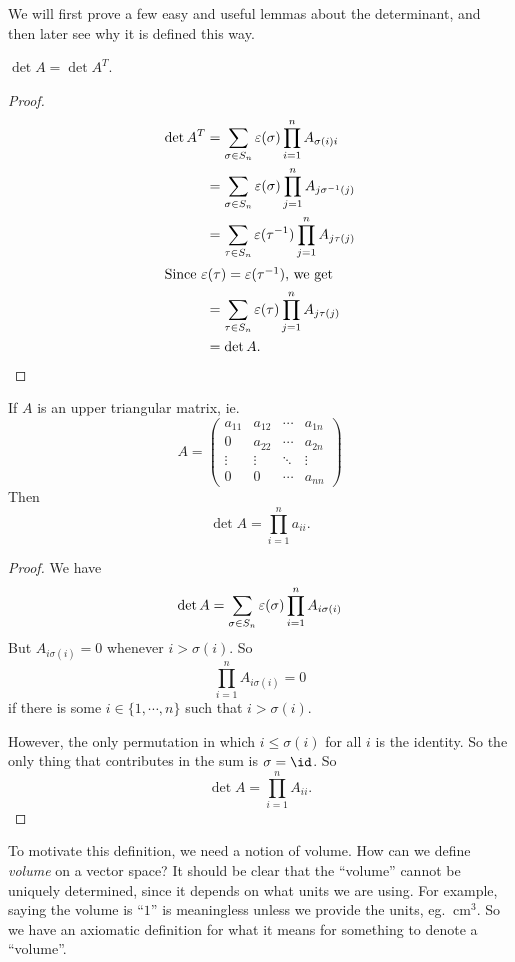 \documentclass[a4paper]{article}
\begin{document}
We will first prove a few easy and useful lemmas about the determinant, and then later see why it is defined this way.
\begin{lemma}
  $\det A = \det A^T$.
\end{lemma}

\begin{proof}
  \begin{align*}
    \det A^T &= \sum_{\sigma \in S_n} \varepsilon(\sigma) \prod_{i = 1}^n A_{\sigma(i)i}\\
    &= \sum_{\sigma \in S_n} \varepsilon (\sigma) \prod_{j = 1}^n A_{j \sigma^{-1}(j)}\\
    &= \sum_{\tau \in S_n} \varepsilon (\tau^{-1}) \prod_{j = 1}^n A_{j \tau (j)}\\
    \intertext{Since $\varepsilon(\tau) = \varepsilon(\tau^{-1})$, we get}
    &= \sum_{\tau \in S_n} \varepsilon (\tau) \prod_{j = 1}^n A_{j \tau (j)}\\
    &= \det A.
  \end{align*}
\end{proof}

\begin{lemma}
  If $A$ is an upper triangular matrix, ie.
  \[
    A =
    \begin{pmatrix}
      a_{11} & a_{12} & \cdots & a_{1n}\\
      0 & a_{22} & \cdots & a_{2n}\\
      \vdots & \vdots & \ddots & \vdots\\
      0 & 0 & \cdots & a_{nn}
    \end{pmatrix}
  \]
  Then
  \[
    \det A = \prod_{i = 1}^n a_{ii}.
  \]
\end{lemma}

\begin{proof}
  We have
  \[
    \det A = \sum_{\sigma \in S_n} \varepsilon(\sigma) \prod_{i = 1}^n A_{i\sigma (i)}\\
  \]
  But $A_{i \sigma(i)} = 0$ whenever $i > \sigma(i)$. So
  \[
    \prod_{i = 1}^n A_{i\sigma(i)} = 0
  \]
  if there is some $i \in \{1, \cdots, n\}$ such that $i > \sigma(i)$.

  However, the only permutation in which $i \leq \sigma(i)$ for all $i$ is the identity. So the only thing that contributes in the sum is $\sigma = \id$. So
  \[
    \det A = \prod_{i = 1}^n A_{ii}.
  \]
\end{proof}
To motivate this definition, we need a notion of volume. How can we define \emph{volume} on a vector space? It should be clear that the ``volume'' cannot be uniquely determined, since it depends on what units we are using. For example, saying the volume is ``$1$'' is meaningless unless we provide the units, eg. $\SI{}{\centi\meter\cubed}$. So we have an axiomatic definition for what it means for something to denote a ``volume''.
\end{document}
